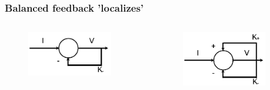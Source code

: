 \documentclass{beamer}
\begin{document}
\begin{frame}
\frametitle{Balanced feedback 'localizes'}
\vspace{-2ex}
\begin{columns}[c]

\begin{figure}
\includegraphics[width=1\linewidth]{linear}
\end{figure}
\\

\begin{figure}
\includegraphics[width=1\linewidth]{localized}
\end{figure}
\vspace{-5ex}
\\


\end{columns}
\end{frame}
\end{document}
